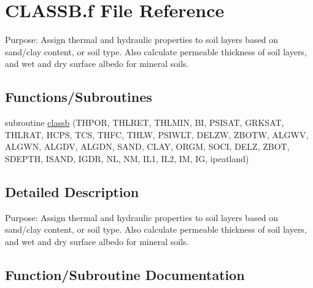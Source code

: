 \hypertarget{CLASSB_8f}{}\section{C\+L\+A\+S\+S\+B.\+f File Reference}
\label{CLASSB_8f}


Purpose\+: Assign thermal and hydraulic properties to soil layers based on sand/clay content, or soil type. Also calculate permeable thickness of soil layers, and wet and dry surface albedo for mineral soils.  


\subsection*{Functions/\+Subroutines}
\begin{DoxyCompactItemize}
\item 
subroutine \hyperlink{CLASSB_8f_abc81628397c097e3244bd460913ec098}{classb} (T\+H\+P\+O\+R, T\+H\+L\+R\+E\+T, T\+H\+L\+M\+I\+N, B\+I, P\+S\+I\+S\+A\+T, G\+R\+K\+S\+A\+T, T\+H\+L\+R\+A\+T, H\+C\+P\+S, T\+C\+S, T\+H\+F\+C, T\+H\+L\+W, P\+S\+I\+W\+L\+T, D\+E\+L\+Z\+W, Z\+B\+O\+T\+W, A\+L\+G\+W\+V, A\+L\+G\+W\+N, A\+L\+G\+D\+V, A\+L\+G\+D\+N, S\+A\+N\+D, C\+L\+A\+Y, O\+R\+G\+M, S\+O\+C\+I, D\+E\+L\+Z, Z\+B\+O\+T, S\+D\+E\+P\+T\+H, I\+S\+A\+N\+D, I\+G\+D\+R, N\+L, N\+M, I\+L1, I\+L2, I\+M, I\+G, ipeatland)
\end{DoxyCompactItemize}


\subsection{Detailed Description}
Purpose\+: Assign thermal and hydraulic properties to soil layers based on sand/clay content, or soil type. Also calculate permeable thickness of soil layers, and wet and dry surface albedo for mineral soils. 



\subsection{Function/\+Subroutine Documentation}
\hypertarget{CLASSB_8f_abc81628397c097e3244bd460913ec098}{}
